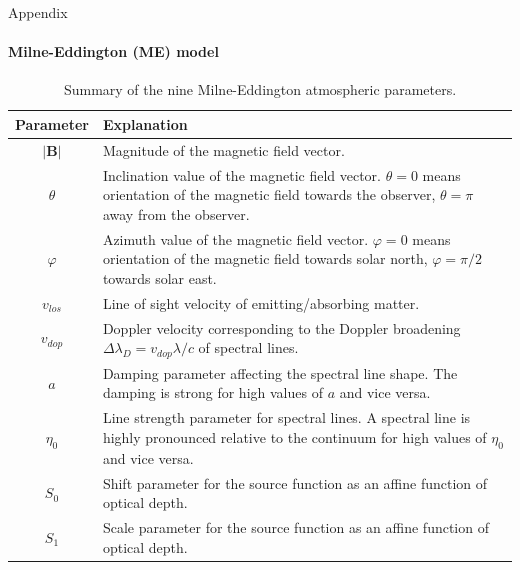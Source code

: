 \documentclass{beamer}
\newcommand\vect[1]{\ensuremath{\bm{#1}}}
\begin{document}
\begin{frame}[allowframebreaks]{Appendix}
	\vspace{-0.5cm}
	\framesubtitle{Milne-Eddington (ME) model}
	\begin{table}[h]
		\centering
		\fontsize{7.5}{10}\selectfont %
		\begin{tabularx}{\textwidth}{|c|X|}
			\hline
			\textbf{Parameter} & \textbf{Explanation} \\
			\hline\hline
			$|\vect{B}|$ & Magnitude of the magnetic field vector. \\
			\hline
			$\theta$ & Inclination value of the magnetic field vector. $\theta=0$ means orientation of the magnetic field towards the observer, $\theta = \pi$ away from the observer.\\
			\hline
			$\varphi$ & Azimuth value of the magnetic field vector. $\varphi=0$ means orientation of the magnetic field towards solar north, $\varphi = \pi/2$ towards solar east.\\
			\hline
			$v_{los}$ & Line of sight velocity of emitting/absorbing matter. \\
			\hline
			$v_{dop}$ & Doppler velocity corresponding to the Doppler broadening $\Delta \lambda_D = v_{dop}\lambda / c$ of spectral lines. \\
			\hline
			$a$ & Damping parameter affecting the spectral line shape. The damping is strong for high values of $a$ and vice versa. \\
			\hline
			$\eta_0$ & Line strength parameter for spectral lines. A spectral line is highly pronounced relative to the continuum for high values of $\eta_0$ and vice versa. \\
			\hline
			$S_0$ & Shift parameter for the source function as an affine function of optical depth. \\
			\hline
			$S_1$ & Scale parameter for the source function as an affine function of optical depth. \\
			\hline
		\end{tabularx}
		\caption{Summary of the nine Milne-Eddington atmospheric parameters.}
		\label{tab:paramsummary}
	\end{table}
\end{frame}
\end{document}
